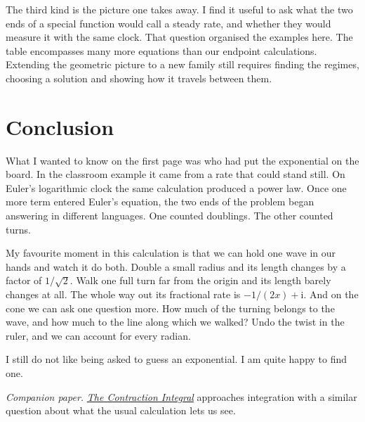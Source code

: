 \documentclass[11pt,a4paper]{amsart}
\newcommand{\ii}{\mathrm{i}}
\theoremstyle{definition}
\theoremstyle{remark}
\begin{document}
The third kind is the picture one takes away. I find it useful to ask what the two ends of a special function would call a steady rate, and whether they would measure it with the same clock. That question organised the examples here. The table encompasses many more equations than our endpoint calculations. Extending the geometric picture to a new family still requires finding the regimes, choosing a solution and showing how it travels between them.

\section{Conclusion}
What I wanted to know on the first page was who had put the exponential on the board. In the classroom example it came from a rate that could stand still. On Euler's logarithmic clock the same calculation produced a power law. Once one more term entered Euler's equation, the two ends of the problem began answering in different languages. One counted doublings. The other counted turns.

My favourite moment in this calculation is that we can hold one wave in our hands and watch it do both. Double a small radius and its length changes by a factor of \(1/\sqrt2\). Walk one full turn far from the origin and its length barely changes at all. The whole way out its fractional rate is \(-1/(2x)+\ii\). And on the cone we can ask one question more. How much of the turning belongs to the wave, and how much to the line along which we walked? Undo the twist in the ruler, and we can account for every radian.

I still do not like being asked to guess an exponential. I am quite happy to find one.

\smallskip
\noindent\textit{Companion paper.} \href{https://github.com/nickyazdani9-ux/mathematical-physics/tree/main/mathematics/contraction_integral}{\emph{The Contraction Integral}} approaches integration with a similar question about what the usual calculation lets us see.
\end{document}

